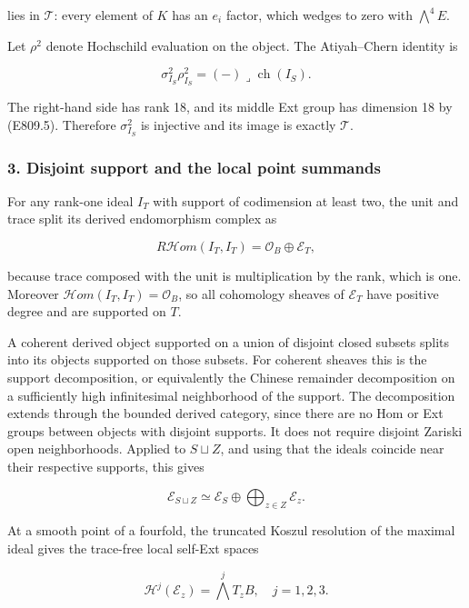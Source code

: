 lies in \(\mathcal T\): every element of \(K\) has an \(e_i\) factor,
which wedges to zero with \(\bigwedge^4E\).

Let \(\rho^2\) denote Hochschild evaluation on the object. The
Atiyah--Chern identity is

\[
 \sigma_{I_S}^2\rho_{I_S}^2
       =(-)\mathbin{\lrcorner}\operatorname{ch}(I_S).
 \tag{E809.12}
\]

The right-hand side has rank 18, and its middle Ext group has dimension
18 by (E809.5). Therefore \(\sigma_{I_S}^2\) is injective and its image
is exactly \(\mathcal T\).

\subsubsection{3. Disjoint support and the local point
summands}\label{disjoint-support-and-the-local-point-summands}

For any rank-one ideal \(I_T\) with support of codimension at least two,
the unit and trace split its derived endomorphism complex as

\[
 R\mathcal Hom(I_T,I_T)=\mathcal O_B\oplus\mathcal E_T,
 \tag{E809.13}
\]

because trace composed with the unit is multiplication by the rank,
which is one. Moreover \(\mathcal Hom(I_T,I_T)=\mathcal O_B\), so all
cohomology sheaves of \(\mathcal E_T\) have positive degree and are
supported on \(T\).

A coherent derived object supported on a union of disjoint closed
subsets splits into its objects supported on those subsets. For coherent
sheaves this is the support decomposition, or equivalently the Chinese
remainder decomposition on a sufficiently high infinitesimal
neighborhood of the support. The decomposition extends through the
bounded derived category, since there are no Hom or Ext groups between
objects with disjoint supports. It does not require disjoint Zariski
open neighborhoods. Applied to \(S\sqcup Z\), and using that the ideals
coincide near their respective supports, this gives

\[
 \mathcal E_{S\sqcup Z}\simeq\mathcal E_S\oplus
                   \bigoplus_{z\in Z}\mathcal E_z.
 \tag{E809.14}
\]

At a smooth point of a fourfold, the truncated Koszul resolution of the
maximal ideal gives the trace-free local self-Ext spaces

\[
 \mathcal H^j(\mathcal E_z)=\bigwedge^j T_zB,
 \quad j=1,2,3.
 \tag{E809.15}
\]

